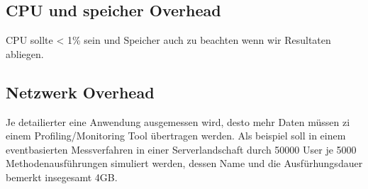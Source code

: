 \documentclass[a4paper,10pt]{scrreprt}
\begin{document}
\subsection{CPU und speicher Overhead} %
\label{sub:cpu_und_speicher_overhead}
CPU sollte < 1\% sein und Speicher auch zu beachten wenn wir Resultaten abliegen.
\subsection{Netzwerk Overhead} %
\label{sub:netzwerk_overhead}
Je detailierter eine Anwendung ausgemessen wird, desto mehr Daten müssen zi einem Profiling/Monitoring Tool übertragen werden. Als beispiel soll in einem eventbasierten Messverfahren in einer Serverlandschaft durch 50000 User je 5000 Methodenausführungen simuliert werden, dessen Name und die Ausfürhungsdauer bemerkt insegesamt 4GB.
\end{document}
